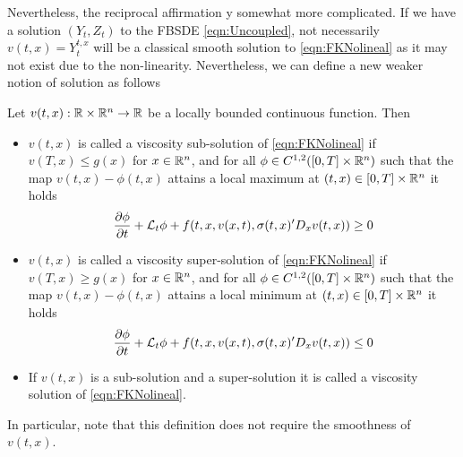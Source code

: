 Nevertheless, the reciprocal affirmation y somewhat more complicated. If we have a solution $(Y_t,Z_t)$ to the FBSDE \eqref{eqn:Uncoupled}, not necessarily $v(t,x)=Y_{t}^{t,x}$ will be a classical smooth solution to \eqref{eqn:FKNolineal} as it may not exist due to the non-linearity. Nevertheless, we can define a new weaker notion of solution as follows 
\begin{definition}
	Let $v(t,x):\mathbb{R}\times \mathbb{R}^n\to \mathbb{R}$ be a locally bounded continuous function. Then 
	\begin{itemize}
		\item $v(t,x)$ is called a viscosity sub-solution of \eqref{eqn:FKNolineal} if $v(T,x)\leq g(x)$ for $x\in\mathbb{R}^n$, and for all $\phi\in C^{1,2}([0,T]\times \mathbb{R}^n)$ such that the map $v(t,x)-\phi(t,x)$ attains a local maximum at $(t,x)\in [0,T]\times \mathbb{R}^n$ it holds
		\begin{equation}
			\frac{\partial \phi}{\partial t} +\mathcal{L}_t \phi +f(t,x,v(x,t),\sigma(t,x)'D_x v(t,x))\geq 0
		\end{equation}
		\item $v(t,x)$ is called a viscosity super-solution of \ref{eqn:FKNolineal} if $v(T,x)\geq g(x)$ for $x\in\mathbb{R}^n$, and for all $\phi\in C^{1,2}([0,T]\times \mathbb{R}^n)$ such that the map $v(t,x)-\phi(t,x)$ attains a local minimum at $(t,x)\in [0,T]\times \mathbb{R}^n$ it holds
	    \begin{equation}
		\frac{\partial \phi}{\partial t} +\mathcal{L}_t \phi +f(t,x,v(x,t),\sigma(t,x)'D_x v(t,x))\leq 0
	    \end{equation}
        \item If $v(t,x)$ is a sub-solution and a super-solution it is called a viscosity solution of \eqref{eqn:FKNolineal}.
	\end{itemize}
\end{definition}
In particular, note that this definition does not require the smoothness of $v(t,x)$.

